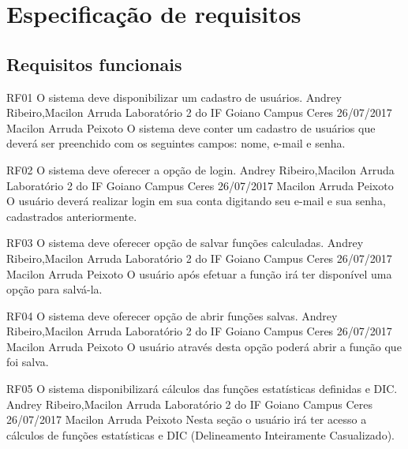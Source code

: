 \chapter{Especificação de requisitos}
 	
\section{Requisitos funcionais}
 	
 \requisitoFuncional
 {RF01}
 {O sistema deve disponibilizar um cadastro de usuários.}
 {Andrey Ribeiro,Macilon Arruda}
 {Laboratório 2 do IF Goiano Campus Ceres}
 {26/07/2017}
 {Macilon Arruda Peixoto}
 {O sistema deve conter um cadastro de usuários que deverá ser preenchido com os seguintes campos: nome, e-mail e senha.
 }
 
 \requisitoFuncional
 {RF02}
 {O sistema deve oferecer a opção de login.}
 {Andrey Ribeiro,Macilon Arruda}
 {Laboratório 2 do IF Goiano Campus Ceres}
 {26/07/2017}
 {Macilon Arruda Peixoto}
 {O usuário deverá realizar login em sua conta digitando seu e-mail e sua senha, cadastrados anteriormente.
 } 
 
 \requisitoFuncional
 {RF03}
 {O sistema deve oferecer opção de salvar funções calculadas.}
 {Andrey Ribeiro,Macilon Arruda}
 {Laboratório 2 do IF Goiano Campus Ceres}
 {26/07/2017}
 {Macilon Arruda Peixoto}
 {O usuário após efetuar a função irá ter disponível uma opção para salvá-la.
 }
 
 \requisitoFuncional
 {RF04}
 {O sistema deve oferecer opção de abrir funções salvas.}
 {Andrey Ribeiro,Macilon Arruda}
 {Laboratório 2 do IF Goiano Campus Ceres}
 {26/07/2017}
 {Macilon Arruda Peixoto}
 {O usuário através desta opção poderá abrir a função que foi salva. 
 }
 
 \requisitoFuncional
 {RF05}
 {O sistema disponibilizará cálculos das funções estatísticas definidas e DIC.}
 {Andrey Ribeiro,Macilon Arruda}
 {Laboratório 2 do IF Goiano Campus Ceres}
 {26/07/2017}
 {Macilon Arruda Peixoto}
 {Nesta seção o usuário irá ter acesso a cálculos de funções estatísticas e DIC (Delineamento Inteiramente Casualizado).
 }
 
